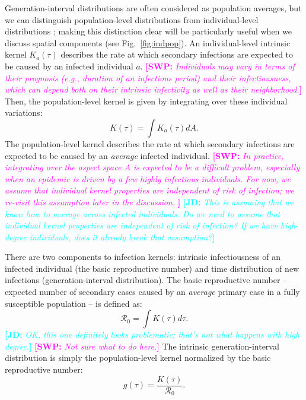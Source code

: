 \documentclass[12pt]{article}
\newcommand{\fref}[1]{Fig.~\ref{fig:#1}}
\newcommand{\RR}{\ensuremath{{\mathcal R}}}
\newcommand{\comment}[3]{\textcolor{#1}{\textbf{[#2: }\textsl{#3}\textbf{]}}}
\newcommand{\jd}[1]{\comment{cyan}{JD}{#1}}
\newcommand{\swp}[1]{\comment{magenta}{SWP}{#1}}
\begin{document}
Generation-interval distributions are often considered as population averages, but we can distinguish population-level distributions from individual-level distributions \citep{svensson2007note, svensson2015influence}; 
making this distinction clear will be particularly useful when we discuss spatial components (see \fref{indpop}).
An individual-level intrinsic kernel $K_a(\tau)$ describes the rate at which secondary infections are expected to be caused by an infected individual $a$.
\swp{Individuals may vary in terms of their prognosis (e.g., duration of an infectious period) and their infectiousness, which can depend both on their intrinsic infectivity as well as their neighborhood.}
Then, the population-level kernel is given by integrating over these individual variations:
\begin{equation}
K(\tau) = \int K_a (\tau) dA.
\end{equation}
The population-level kernel describes the rate at which secondary infections are expected to be caused by an \emph{average} infected individual.
\swp{
In practice, integrating over the aspect space $A$ is expected to be a difficult problem, especially when an epidemic is driven by a few highly infectious individuals.
For now, we assume that individual kernel properties are independent of risk of infection;
we re-visit this assumption later in the discussion.
}
\jd{This is assuming that we know how to average across infected individuals. Do we need to assume that individual kernel properties are independent of risk of infection? If we have high-degree individuals, does it already break that assumption?}

There are two components to infection kernels: intrinsic infectiousness of an infected individual (the basic reproductive number) and time distribution of new infections (generation-interval distribution).
The basic reproductive number -- expected number of secondary cases caused by an \emph{average} primary case in a fully susceptible population -- is defined as: 
\begin{equation}
\RR_0 = \int K(\tau) d\tau.
\end{equation}
\jd{OK, this one definitely looks problematic; that's not what happens with high degree.}
\swp{Not sure what to do here.}
The intrinsic generation-interval distribution is simply the population-level kernel normalized by the basic reproductive number:
\begin{equation}
g(\tau) = \frac{K(\tau)}{\RR_0}.
\end{equation}
\end{document}
